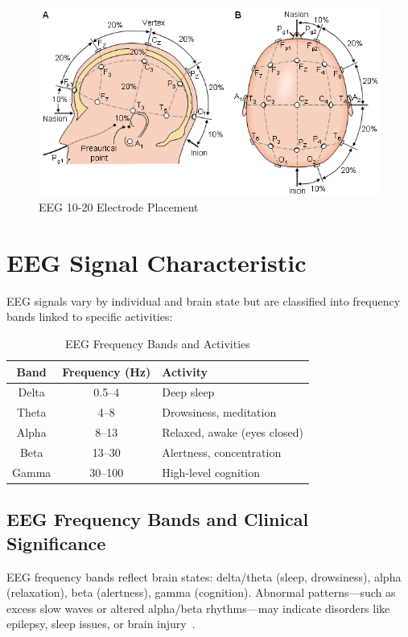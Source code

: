 \documentclass[11pt]{article}
\begin{document}
\begin{figure}[H]
    \centering
    \includegraphics[width=.37\textwidth]{placement.png}
    \caption{EEG 10-20 Electrode Placement\cite{place}}
\end{figure}

\section*{EEG Signal Characteristic}
EEG signals vary by individual and brain state but are classified into frequency bands linked to specific activities:

\begin{table}[H]
    \centering
    \begin{tabular}{|c|c|l|}
        \hline
        \textbf{Band} & \textbf{Frequency (Hz)} & \textbf{Activity}            \\
        \hline
        Delta         & 0.5--4                  & Deep sleep                   \\
        Theta         & 4--8                    & Drowsiness, meditation       \\
        Alpha         & 8--13                   & Relaxed, awake (eyes closed) \\
        Beta          & 13--30                  & Alertness, concentration     \\
        Gamma         & 30--100                 & High-level cognition         \\
        \hline
    \end{tabular}
    \caption{EEG Frequency Bands and Activities\cite{siuly2016eeg}}
\end{table}

\subsection*{EEG Frequency Bands and Clinical Significance}
EEG frequency bands reflect brain states: delta/theta (sleep, drowsiness), alpha (relaxation), beta (alertness), gamma (cognition). Abnormal patterns—such as excess slow waves or altered alpha/beta rhythms—may indicate disorders like epilepsy, sleep issues, or brain injury~\cite{siuly2016eeg}.
\end{document}
